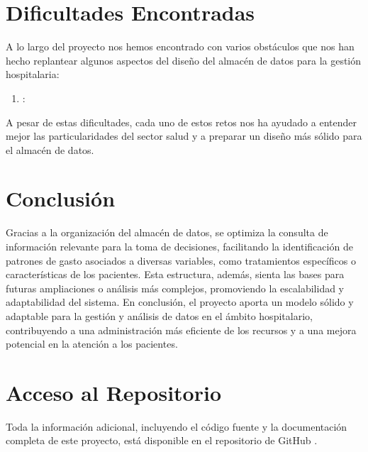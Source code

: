 \documentclass{article}
\begin{document}
	\section{Dificultades Encontradas}
	\label{sec:dificultades_encontradas}
	
	A lo largo del proyecto nos hemos encontrado con varios obstáculos que nos han hecho replantear algunos aspectos del diseño del almacén de datos para la gestión hospitalaria:
	
	\begin{enumerate}
		\item \textbf{}:
	\end{enumerate}
	
	A pesar de estas dificultades, cada uno de estos retos nos ha ayudado a entender mejor las particularidades del sector salud y a preparar un diseño más sólido para el almacén de datos.
	
	\section{Conclusión}
	\label{sec:conclusion}
	
	Gracias a la organización del almacén de datos, se optimiza la consulta de información relevante para la toma de decisiones, facilitando la identificación de patrones de gasto asociados a diversas variables, como tratamientos específicos o características de los pacientes. Esta estructura, además, sienta las bases para futuras ampliaciones o análisis más complejos, promoviendo la escalabilidad y adaptabilidad del sistema. En conclusión, el proyecto aporta un modelo sólido y adaptable para la gestión y análisis de datos en el ámbito hospitalario, contribuyendo a una administración más eficiente de los recursos y a una mejora potencial en la atención a los pacientes.
	
	\newpage
	\section{Acceso al Repositorio}
	
	Toda la información adicional, incluyendo el código fuente y la documentación completa de este proyecto, está disponible en el repositorio de GitHub \cite{silva2024github}.
	
	
\end{document}

